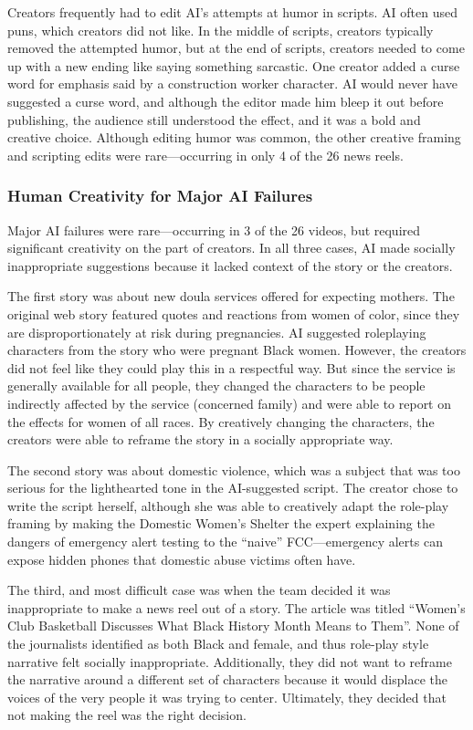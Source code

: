 Creators frequently had to edit AI's attempts at humor in scripts. AI often used puns, which creators did not like. 
In the middle of scripts, creators typically removed the attempted humor, but at the end of scripts, creators needed to come up with a new ending like saying something sarcastic. 
One creator added a curse word for emphasis said by a construction worker character. 
AI would never have suggested a curse word, and although the editor made him bleep it out before publishing, the audience still understood the effect, and it was a bold and creative choice.
Although editing humor was common, the other creative framing and scripting edits were rare---occurring in only 4 of the 26 news reels. 



\subsubsection{Human Creativity for Major AI Failures} 
\label{sec:AI_failure}
Major AI failures were rare---occurring in 3 of the 26 videos, but required significant creativity on the part of creators. 
In all three cases, AI made socially inappropriate suggestions because it lacked context of the story or the creators. 

The first story was about new doula services offered for expecting mothers. 
The original web story featured quotes and reactions from women of color, since they are disproportionately at risk during pregnancies.
AI suggested roleplaying characters from the story who were pregnant Black women. 
However, the creators did not feel like they could play this in a respectful way. 
But since the service is generally available for all people, they changed the characters to be people indirectly affected by the service (concerned family) and were able to report on the effects for women of all races. 
By creatively changing the characters, the creators were able to reframe the story in a socially appropriate way.

The second story was about domestic violence, which was a subject that was too serious for the lighthearted tone in the AI-suggested script.  
The creator chose to write the script herself, although she was able to creatively adapt the role-play framing by making the Domestic Women's Shelter the expert explaining the dangers of emergency alert testing to the ``naive'' FCC---emergency alerts can expose hidden phones that domestic abuse victims often have. 


The third, and most difficult case was when the team decided it was inappropriate to make a news reel out of a story. 
The article was titled ``Women’s Club Basketball Discusses What Black History Month Means to Them''. 
None of the journalists identified as both Black and female, and thus role-play style narrative felt socially inappropriate. 
Additionally, they did not want to reframe the narrative around a different set of characters because it would displace the voices of the very people it was trying to center. 
Ultimately, they decided that not making the reel was the right decision.

